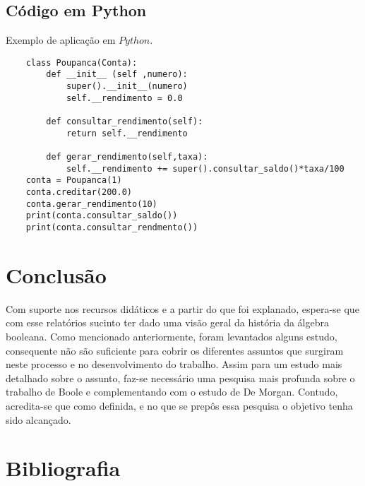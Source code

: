 \documentclass[11pt,a4paper]{article}
\begin{document}
\newpage
\subsection{Código em Python}

Exemplo de aplicação em $Python$.
\vspace{0.1in}
	
  \begin{lstlisting}
    class Poupanca(Conta):
        def __init__ (self ,numero):
            super().__init__(numero)
            self.__rendimento = 0.0

        def consultar_rendimento(self):
            return self.__rendimento

        def gerar_rendimento(self,taxa):
            self.__rendimento += super().consultar_saldo()*taxa/100
    conta = Poupanca(1)
    conta.creditar(200.0)
    conta.gerar_rendimento(10)
    print(conta.consultar_saldo())
    print(conta.consultar_rendmento())
	\end{lstlisting}


\vspace{0.5in}
%   
\section{Conclusão}

Com suporte nos recursos didáticos e a partir do que foi explanado, espera-se que com esse relatórios sucinto ter dado uma visão geral da história da álgebra booleana. Como mencionado anteriormente, foram levantados alguns estudo, consequente não são suficiente para cobrir os diferentes assuntos que surgiram neste processo e no desenvolvimento do trabalho. Assim para um estudo mais detalhado sobre o assunto, faz-se necessário uma pesquisa mais profunda sobre o trabalho de Boole e complementando com o estudo de De Morgan. Contudo, acredita-se que como definida, e no que se prepôs essa pesquisa o objetivo tenha sido alcançado.  
% 

\section{Bibliografia}
\printbibliography
% 
% 
% 
% 
\end{document}
